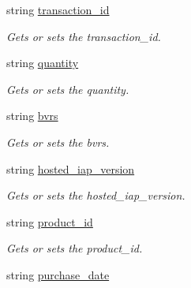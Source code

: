 \begin{DoxyCompactItemize}
string \mbox{\hyperlink{class_t_net_1_1_contract_1_1_action_1_1_app_store_pay_action_1_1_receipt_acf84422a7ed31f227fa0f5ee38021c09}{transaction\+\_\+id}}
\begin{DoxyCompactList}\small\item\em Gets or sets the transaction\+\_\+id. \end{DoxyCompactList}\item 
string \mbox{\hyperlink{class_t_net_1_1_contract_1_1_action_1_1_app_store_pay_action_1_1_receipt_a62d71279f505d52a69a45e35894cbbb9}{quantity}}
\begin{DoxyCompactList}\small\item\em Gets or sets the quantity. \end{DoxyCompactList}\item 
string \mbox{\hyperlink{class_t_net_1_1_contract_1_1_action_1_1_app_store_pay_action_1_1_receipt_aa19474b714b0bf4a13a9b11edb6023e0}{bvrs}}
\begin{DoxyCompactList}\small\item\em Gets or sets the bvrs. \end{DoxyCompactList}\item 
string \mbox{\hyperlink{class_t_net_1_1_contract_1_1_action_1_1_app_store_pay_action_1_1_receipt_a7ea3718a2589f30d71645df57b7d29ea}{hosted\+\_\+iap\+\_\+version}}
\begin{DoxyCompactList}\small\item\em Gets or sets the hosted\+\_\+iap\+\_\+version. \end{DoxyCompactList}\item 
string \mbox{\hyperlink{class_t_net_1_1_contract_1_1_action_1_1_app_store_pay_action_1_1_receipt_a7c8f1f6f55e0890b05563d3ede25df91}{product\+\_\+id}}
\begin{DoxyCompactList}\small\item\em Gets or sets the product\+\_\+id. \end{DoxyCompactList}\item 
string \mbox{\hyperlink{class_t_net_1_1_contract_1_1_action_1_1_app_store_pay_action_1_1_receipt_a4cac7e10766257f1d99c38cc11c60541}{purchase\+\_\+date}}

\end{DoxyCompactItemize}
